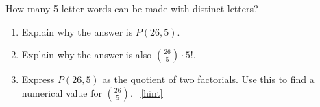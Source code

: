 \documentclass{book}
\begin{document}
\setcounter{project}{92}
\addtocounter{project}{-1}
\begin{activity}[]\label{activity-85}
\hypertarget{p-706}{}%
How many 5-letter words can be made with distinct letters?%
\begin{enumerate}[font=\bfseries,label=(\alph*),ref=\alph*]
\item\label{task-139} \hypertarget{p-707}{}%
Explain why the answer is \(P(26,5)\).%
\item\label{task-140} \hypertarget{p-708}{}%
Explain why the answer is also \(\binom{26}{5}\cdot 5!\).%
\item\label{task-141} \hypertarget{p-709}{}%
Express \(P(26,5)\) as the quotient of two factorials.  Use this to find a numerical value for \(\binom{26}{5}\).%
~\hfill{\tiny\hyperlink{a-92.c}{[hint]}\hypertarget{q-92.c}{}}\end{enumerate}
\end{activity}
\end{document}
